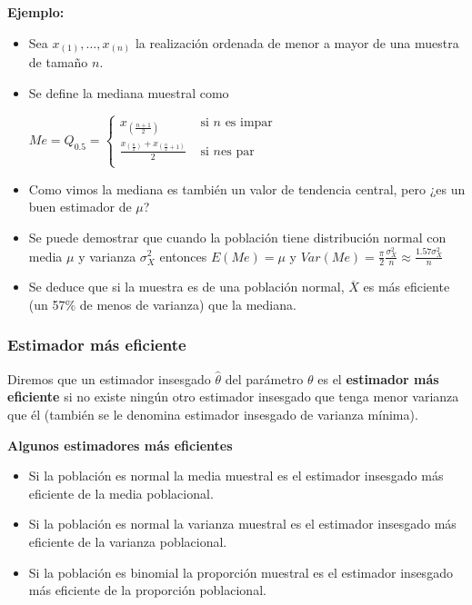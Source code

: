 \begin{frame}
\textbf{Ejemplo:}

\begin{itemize}
\item     Sea $x_{(1)},\ldots,x_{(n)}$ la realización ordenada de menor a mayor
     de una muestra de tamaño $n$. 
\item Se define la mediana muestral como

     $Me=Q_{0.5}=\left\{\begin{array}{ll}
     x_{\left(\frac{n+1}{2}\right)} & \mbox{ si  } n  \mbox{  es impar }\\
      \frac{x_{\left(\frac{n}{2}\right)}+ x_{\left(\frac{n}{2}+1\right)}}{2} & \mbox{ si } n  \mbox{
      es par }\\
     \end{array}\right.$
\item Como vimos  la mediana es también un valor de
     tendencia central, pero ¿es un buen estimador de $\mu$?
\item Se puede demostrar que cuando la población tiene distribución normal
     con media $\mu$ y varianza $\sigma_{X}^2$ entonces
     $E(Me)=\mu$ y $Var(Me)=\frac{\pi}{2}
     \frac{\sigma_{X}^2}{n}\approx \frac{1.57 \sigma_{X}^2}{n}$
\item Se deduce que si la muestra es de una población normal, $\overline{X}$
      es más eficiente  (un 57\%  de menos de varianza) que la mediana.
\end{itemize}  
\end{frame}

\begin{frame}
  \frametitle{Estimador más eficiente}

      Diremos que un estimador insesgado $\hat{\theta}$
      del parámetro $\theta$ es el \textbf{estimador más eficiente} si no
      existe ningún otro estimador insesgado que tenga menor varianza
      que él (también se le denomina estimador insesgado de varianza
      mínima).

\textbf{Algunos estimadores más eficientes}
      \begin{itemize}
       \item Si la población es normal la media muestral es el
       estimador insesgado más eficiente de la media poblacional.
       \item Si la población es normal la varianza muestral es el
       estimador insesgado  más eficiente de la varianza poblacional.
       \item Si la población es binomial la proporción muestral es el
       estimador insesgado más eficiente de la proporción poblacional.
      \end{itemize}
  
\end{frame}





